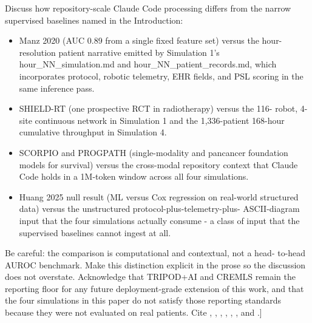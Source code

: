 Discuss how repository-scale Claude Code processing differs from the
narrow supervised baselines named in the Introduction:
\begin{itemize}[leftmargin=*]
\item Manz 2020 (AUC 0.89 from a single fixed feature set) versus the
hour-resolution patient narrative emitted by Simulation 1's
hour\_NN\_simulation.md and hour\_NN\_patient\_records.md, which
incorporates protocol, robotic telemetry, EHR fields, and PSL scoring in
the same inference pass.
\item SHIELD-RT (one prospective RCT in radiotherapy) versus the 116-
robot, 4-site continuous network in Simulation 1 and the 1,336-patient
168-hour cumulative throughput in Simulation 4.
\item SCORPIO and PROGPATH (single-modality and pancancer foundation
models for survival) versus the cross-modal repository context that
Claude Code holds in a 1M-token window across all four simulations.
\item Huang 2025 null result (ML versus Cox regression on real-world
structured data) versus the unstructured protocol-plus-telemetry-plus-
ASCII-diagram input that the four simulations actually consume - a class
of input that the supervised baselines cannot ingest at all.
\end{itemize}
Be careful: the comparison is computational and contextual, not a head-
to-head AUROC benchmark. Make this distinction explicit in the prose so
the discussion does not overstate. Acknowledge that TRIPOD+AI and CREMLS
remain the reporting floor for any future deployment-grade extension of
this work, and that the four simulations in this paper do not satisfy
those reporting standards because they were not evaluated on real
patients. Cite \cite{Huang2025CancerSurvivalMetaAnalysis},
\cite{Manz2020Oncology180DayMortality}, \cite{Hong2020SHIELDRT},
\cite{Yoo2025SCORPIO}, \cite{Yuan2025PROGPATH}, \cite{Collins2024TRIPODAI},
and \cite{ElEmam2024CREMLS}.]

